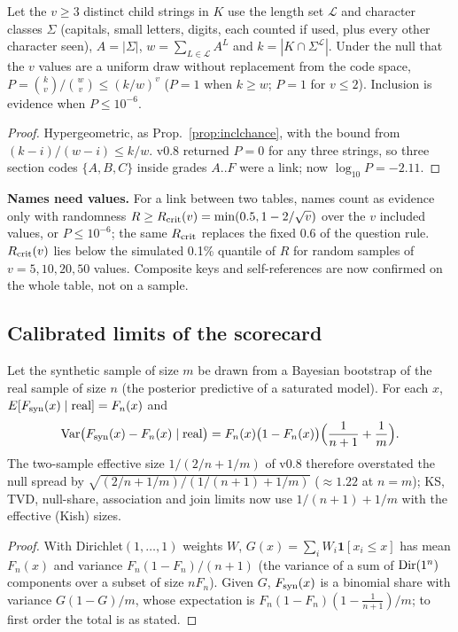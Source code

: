 \begin{proposition}\label{prop:stringchance}
Let the $v\ge3$ distinct child strings in $K$ use the length set $\mathcal L$ and character classes $\Sigma$ (capitals, small letters, digits, each counted if used, plus every other character seen), $A=|\Sigma|$, $w=\sum_{L\in\mathcal L}A^L$ and $k=|K\cap\Sigma^{\mathcal L}|$. Under the null that the $v$ values are a uniform draw without replacement from the code space, $P=\binom kv/\binom wv\le(k/w)^v$ ($P=1$ when $k\ge w$; $P=1$ for $v\le2$). Inclusion is evidence when $P\le10^{-6}$.
\end{proposition}
\begin{proof}
Hypergeometric, as Prop.~\ref{prop:inclchance}, with the bound from $(k-i)/(w-i)\le k/w$. v0.8 returned $P=0$ for any three strings, so three section codes $\{A,B,C\}$ inside grades $A..F$ were a link; now $\log_{10}P=-2.11$.
\end{proof}

\noindent \textbf{Names need values.} For a link between two tables, names count as evidence only with randomness $R\ge R_{\rm crit}(v)=\min(0.5,1-2/\sqrt v)$ over the $v$ included values, or $P\le10^{-6}$; the same $R_{\rm crit}$ replaces the fixed 0.6 of the question rule. $R_{\rm crit}(v)$ lies below the simulated 0.1\% quantile of $R$ for random samples of $v=5,10,20,50$ values. Composite keys and self-references are now confirmed on the whole table, not on a sample.

\subsection{Calibrated limits of the scorecard}
\begin{proposition}\label{prop:ppnull}
Let the synthetic sample of size $m$ be drawn from a Bayesian bootstrap of the real sample of size $n$ (the posterior predictive of a saturated model). For each $x$, $E[F_{\rm syn}(x)\mid\text{real}]=F_n(x)$ and
\[\mathrm{Var}\bigl(F_{\rm syn}(x)-F_n(x)\mid\text{real}\bigr)=F_n(x)\bigl(1-F_n(x)\bigr)\Bigl(\frac1{n+1}+\frac1m\Bigr).\]
The two-sample effective size $1/(2/n+1/m)$ of v0.8 therefore overstated the null spread by $\sqrt{(2/n+1/m)/(1/(n+1)+1/m)}$ ($\approx1.22$ at $n=m$); KS, TVD, null-share, association and join limits now use $1/(n+1)+1/m$ with the effective (Kish) sizes.
\end{proposition}
\begin{proof}
With Dirichlet$(1,\dots,1)$ weights $W$, $G(x)=\sum_iW_i\mathbf 1[x_i\le x]$ has mean $F_n(x)$ and variance $F_n(1-F_n)/(n+1)$ (the variance of a sum of $\operatorname{Dir}(1^n)$ components over a subset of size $nF_n$). Given $G$, $F_{\rm syn}(x)$ is a binomial share with variance $G(1-G)/m$, whose expectation is $F_n(1-F_n)(1-\frac1{n+1})/m$; to first order the total is as stated.
\end{proof}

